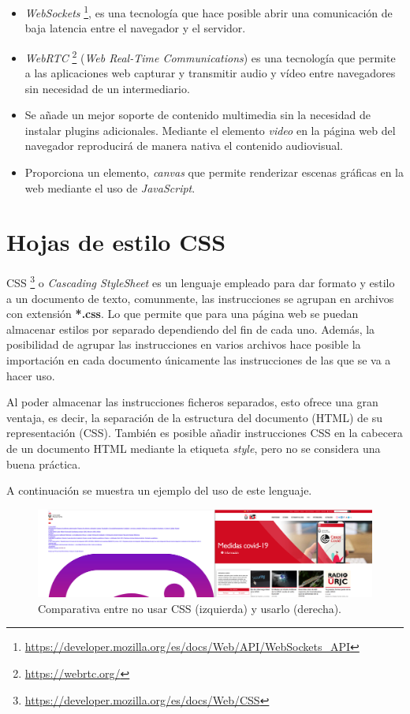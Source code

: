 \documentclass[a4paper, 12pt]{book}
\begin{document}
\begin{itemize}
\itemsep 0em
\item \textit{WebSockets} \footnote{\url{https://developer.mozilla.org/es/docs/Web/API/WebSockets_API}}, es una tecnología que hace posible abrir una comunicación de baja latencia entre el navegador y el servidor.
\item \textit{WebRTC} \footnote{\url{https://webrtc.org/}} (\textit{Web Real-Time Communications}) es una tecnología que permite a las aplicaciones web capturar y transmitir audio y vídeo entre navegadores sin necesidad de un intermediario.
\item Se añade un mejor soporte de contenido multimedia sin la necesidad de instalar plugins adicionales. Mediante el elemento \textit{video} en la página web del navegador reproducirá de manera nativa el contenido audiovisual.
\item Proporciona un elemento, \textit{canvas} que permite renderizar escenas gráficas en la web mediante el uso de \textit{JavaScript}.
\end{itemize}

\section{Hojas de estilo CSS}
\label{sec:css}

CSS \footnote{\url{https://developer.mozilla.org/es/docs/Web/CSS}} o \textit{Cascading StyleSheet} es un lenguaje empleado para dar formato y estilo a un documento de texto, comunmente, las instrucciones se agrupan en archivos con extensión \textbf{*.css}. Lo que permite que para una página web se puedan almacenar estilos por separado dependiendo del fin de cada uno. Además, la posibilidad de agrupar las instrucciones en varios archivos hace posible la importación en cada documento únicamente las instrucciones de las que se va a hacer uso.

Al poder almacenar las instrucciones ficheros separados, esto ofrece una gran ventaja, es decir, la separación de la estructura del documento (HTML) de su representación (CSS). También es posible añadir instrucciones CSS en la cabecera de un documento HTML mediante la etiqueta \textit{style}, pero  no se considera una buena práctica.

A continuación se muestra un ejemplo del uso de este lenguaje.

\begin{figure}[H]
	\centering
    \includegraphics[width=15cm]{img/nocss_vs_css}
    \caption{Comparativa entre no usar CSS (izquierda) y usarlo (derecha).}
    \label{figura:nocss_vs_css}
\end{figure}
\end{document}
